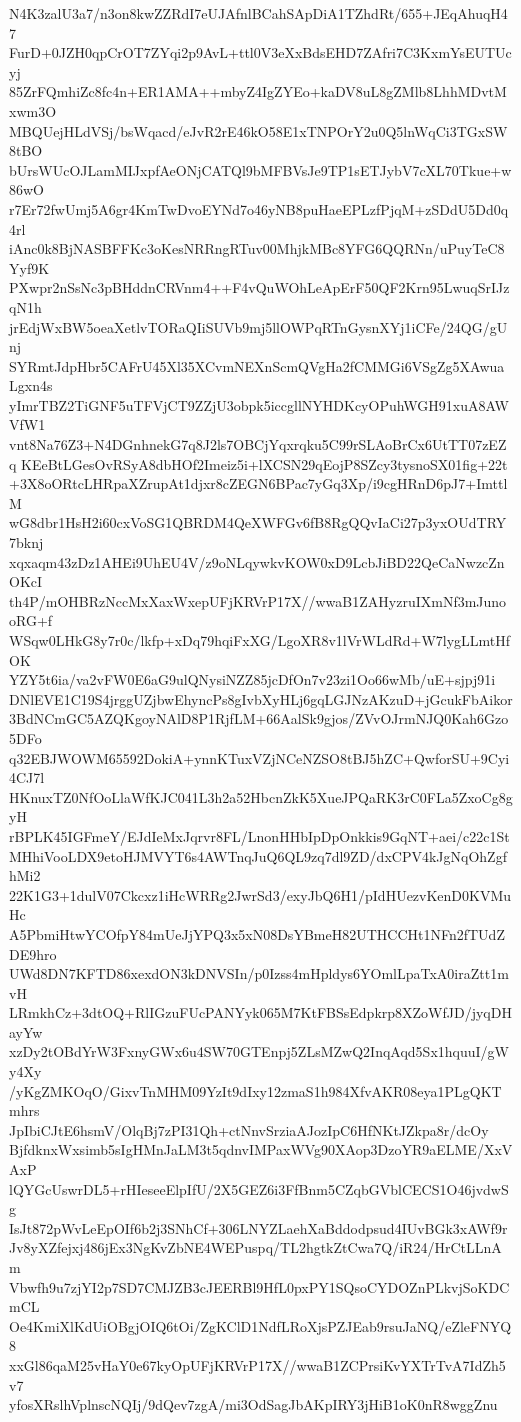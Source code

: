 N4K3zalU3a7/n3on8kwZZRdI7eUJAfnlBCahSApDiA1TZhdRt/655+JEqAhuqH47
FurD+0JZH0qpCrOT7ZYqi2p9AvL+ttl0V3eXxBdsEHD7ZAfri7C3KxmYsEUTUcyj
85ZrFQmhiZc8fc4n+ER1AMA++mbyZ4IgZYEo+kaDV8uL8gZMlb8LhhMDvtMxwm3O
MBQUejHLdVSj/bsWqacd/eJvR2rE46kO58E1xTNPOrY2u0Q5lnWqCi3TGxSW8tBO
bUrsWUcOJLamMIJxpfAeONjCATQl9bMFBVsJe9TP1sETJybV7cXL70Tkue+w86wO
r7Er72fwUmj5A6gr4KmTwDvoEYNd7o46yNB8puHaeEPLzfPjqM+zSDdU5Dd0q4rl
iAnc0k8BjNASBFFKc3oKesNRRngRTuv00MhjkMBc8YFG6QQRNn/uPuyTeC8Yyf9K
PXwpr2nSsNc3pBHddnCRVnm4++F4vQuWOhLeApErF50QF2Krn95LwuqSrIJzqN1h
jrEdjWxBW5oeaXetlvTORaQIiSUVb9mj5llOWPqRTnGysnXYj1iCFe/24QG/gUnj
SYRmtJdpHbr5CAFrU45Xl35XCvmNEXnScmQVgHa2fCMMGi6VSgZg5XAwuaLgxn4s
yImrTBZ2TiGNF5uTFVjCT9ZZjU3obpk5iccgllNYHDKcyOPuhWGH91xuA8AWVfW1
vnt8Na76Z3+N4DGnhnekG7q8J2ls7OBCjYqxrqku5C99rSLAoBrCx6UtTT07zEZq
KEeBtLGesOvRSyA8dbHOf2Imeiz5i+lXCSN29qEojP8SZcy3tysnoSX01fig+22t
+3X8oORtcLHRpaXZrupAt1djxr8cZEGN6BPac7yGq3Xp/i9cgHRnD6pJ7+ImttlM
wG8dbr1HsH2i60cxVoSG1QBRDM4QeXWFGv6fB8RgQQvIaCi27p3yxOUdTRY7bknj
xqxaqm43zDz1AHEi9UhEU4V/z9oNLqywkvKOW0xD9LcbJiBD22QeCaNwzcZnOKcI
th4P/mOHBRzNccMxXaxWxepUFjKRVrP17X//wwaB1ZAHyzruIXmNf3mJunooRG+f
WSqw0LHkG8y7r0c/lkfp+xDq79hqiFxXG/LgoXR8v1lVrWLdRd+W7lygLLmtHfOK
YZY5t6ia/va2vFW0E6aG9ulQNysiNZZ85jcDfOn7v23zi1Oo66wMb/uE+sjpj91i
DNlEVE1C19S4jrggUZjbwEhyncPs8gIvbXyHLj6gqLGJNzAKzuD+jGcukFbAikor
3BdNCmGC5AZQKgoyNAlD8P1RjfLM+66AalSk9gjos/ZVvOJrmNJQ0Kah6Gzo5DFo
q32EBJWOWM65592DokiA+ynnKTuxVZjNCeNZSO8tBJ5hZC+QwforSU+9Cyi4CJ7l
HKnuxTZ0NfOoLlaWfKJC041L3h2a52HbcnZkK5XueJPQaRK3rC0FLa5ZxoCg8gyH
rBPLK45IGFmeY/EJdIeMxJqrvr8FL/LnonHHbIpDpOnkkis9GqNT+aei/c22c1St
MHhiVooLDX9etoHJMVYT6s4AWTnqJuQ6QL9zq7dl9ZD/dxCPV4kJgNqOhZgfhMi2
22K1G3+1dulV07Ckcxz1iHcWRRg2JwrSd3/exyJbQ6H1/pIdHUezvKenD0KVMuHc
A5PbmiHtwYCOfpY84mUeJjYPQ3x5xN08DsYBmeH82UTHCCHt1NFn2fTUdZDE9hro
UWd8DN7KFTD86xexdON3kDNVSIn/p0Izss4mHpldys6YOmlLpaTxA0iraZtt1mvH
LRmkhCz+3dtOQ+RlIGzuFUcPANYyk065M7KtFBSsEdpkrp8XZoWfJD/jyqDHayYw
xzDy2tOBdYrW3FxnyGWx6u4SW70GTEnpj5ZLsMZwQ2InqAqd5Sx1hquuI/gWy4Xy
/yKgZMKOqO/GixvTnMHM09YzIt9dIxy12zmaS1h984XfvAKR08eya1PLgQKTmhrs
JpIbiCJtE6hsmV/OlqBj7zPI31Qh+ctNnvSrziaAJozIpC6HfNKtJZkpa8r/dcOy
BjfdknxWxsimb5sIgHMnJaLM3t5qdnvIMPaxWVg90XAop3DzoYR9aELME/XxVAxP
lQYGcUswrDL5+rHIeseeElpIfU/2X5GEZ6i3FfBnm5CZqbGVblCECS1O46jvdwSg
IsJt872pWvLeEpOIf6b2j3SNhCf+306LNYZLaehXaBddodpsud4IUvBGk3xAWf9r
Jv8yXZfejxj486jEx3NgKvZbNE4WEPuspq/TL2hgtkZtCwa7Q/iR24/HrCtLLnAm
Vbwfh9u7zjYI2p7SD7CMJZB3cJEERBl9HfL0pxPY1SQsoCYDOZnPLkvjSoKDCmCL
Oe4KmiXlKdUiOBgjOIQ6tOi/ZgKClD1NdfLRoXjsPZJEab9rsuJaNQ/eZleFNYQ8
xxGl86qaM25vHaY0e67kyOpUFjKRVrP17X//wwaB1ZCPrsiKvYXTrTvA7IdZh5v7
yfosXRslhVplnscNQIj/9dQev7zgA/mi3OdSagJbAKpIRY3jHiB1oK0nR8wggZnu
